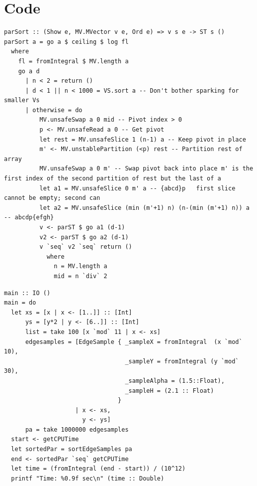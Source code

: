 \documentclass[12pt, a4paper]{article}
\begin{document}
\section{Code}
\begin{lstlisting}[label={lst:parsort}, caption={Parallel Sorting}]
parSort :: (Show e, MV.MVector v e, Ord e) => v s e -> ST s ()
parSort a = go a $ ceiling $ log fl
  where
    fl = fromIntegral $ MV.length a
    go a d
      | n < 2 = return ()
      | d < 1 || n < 1000 = VS.sort a -- Don't bother sparking for smaller Vs
      | otherwise = do
          MV.unsafeSwap a 0 mid -- Pivot index > 0
          p <- MV.unsafeRead a 0 -- Get pivot
          let rest = MV.unsafeSlice 1 (n-1) a -- Keep pivot in place
          m' <- MV.unstablePartition (<p) rest -- Partition rest of array
          MV.unsafeSwap a 0 m' -- Swap pivot back into place m' is the first index of the second partition of rest but the last of a
          let a1 = MV.unsafeSlice 0 m' a -- {abcd}p   first slice cannot be empty; second can
          let a2 = MV.unsafeSlice (min (m'+1) n) (n-(min (m'+1) n)) a -- abcdp{efgh}
          v <- parST $ go a1 (d-1)
          v2 <- parST $ go a2 (d-1)
          v `seq` v2 `seq` return ()
            where
              n = MV.length a
              mid = n `div` 2
\end{lstlisting}%


\begin{lstlisting}[label={lst:sorting}]
main :: IO ()
main = do
  let xs = [x | x <- [1..]] :: [Int]
      ys = [y*2 | y <- [6..]] :: [Int]
      list = take 100 [x `mod` 11 | x <- xs]
      edgesamples = [EdgeSample { _sampleX = fromIntegral  (x `mod` 10),
                                  _sampleY = fromIntegral (y `mod` 30),
                                  _sampleAlpha = (1.5::Float),
                                  _sampleH = (2.1 :: Float)
                                }
                    | x <- xs,
                      y <- ys]
      pa = take 1000000 edgesamples
  start <- getCPUTime
  let sortedPar = sortEdgeSamples pa
  end <- sortedPar `seq` getCPUTime
  let time = (fromIntegral (end - start)) / (10^12)
  printf "Time: %0.9f sec\n" (time :: Double)
\end{lstlisting}
\end{document}
